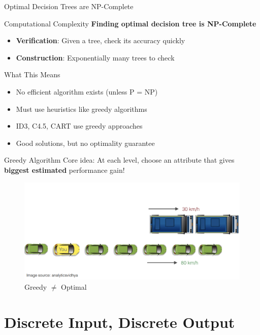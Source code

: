 \documentclass[usenames,dvipsnames]{beamer}
\begin{document}
\begin{frame}{Optimal Decision Trees are NP-Complete}
\begin{alertbox}{Computational Complexity}
\textbf{Finding optimal decision tree is NP-Complete}
\begin{itemize}
\item \textbf{Verification}: Given a tree, check its accuracy quickly \checkmark
\item \textbf{Construction}: Exponentially many trees to check \crossmark
\end{itemize}
\end{alertbox}

\pause
\begin{examplebox}{What This Means}
\begin{itemize}
\item No efficient algorithm exists (unless P = NP)
\item Must use heuristics like greedy algorithms
\item ID3, C4.5, CART use greedy approaches
\item Good solutions, but no optimality guarantee
\end{itemize}
\end{examplebox}
\end{frame}


\begin{frame}{Greedy Algorithm}
Core idea: At each level, choose an attribute that gives
\textbf{biggest estimated} performance gain!

\begin{figure}
	\centering
	\includegraphics[width=0.8\linewidth]{../assets/decision-trees/diagrams/gredy}
	\caption{Greedy $\neq$ Optimal}
	\label{fig:gredy}
\end{figure}

\end{frame}


\section{Discrete Input, Discrete Output}
\end{document}
